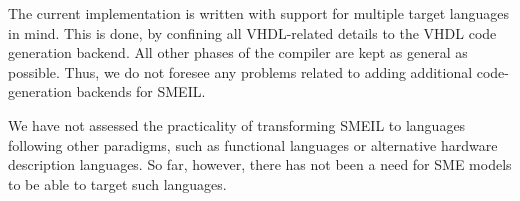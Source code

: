 The current \libsme{} implementation is written with support for multiple target
languages in mind. This is done, by confining all VHDL-related details to the
VHDL code generation backend. All other phases of the compiler are kept as
general as possible. Thus, we do not foresee any problems related to adding
additional code-generation backends for SMEIL.

We have not assessed the practicality of transforming SMEIL to languages
following other paradigms, such as functional languages or alternative hardware
description languages. So far, however, there has not been a need for SME models
to be able to target such languages.



